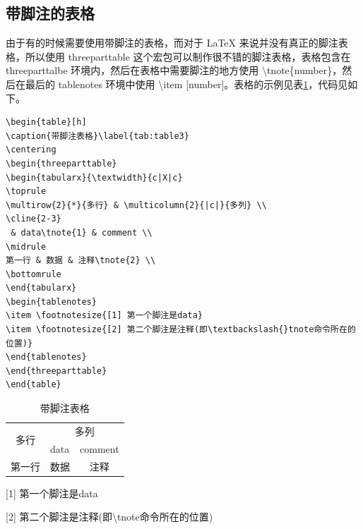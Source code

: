 \documentclass[a4paper,12pt]{ctexart}
\begin{document}
\subsection{带脚注的表格}
由于有的时候需要使用带脚注的表格，而对于 \LaTeX{} 来说并没有真正的脚注表格，所以使用 threeparttable 这个宏包可以制作很不错的脚注表格，表格包含在 threeparttalbe 环境内，然后在表格中需要脚注的地方使用 \textbackslash{}tnote\{number\}，然后在最后的 tablenotes 环境中使用 \textbackslash{}item [number]。表格的示例见表\ref{tab:table3}，代码见如下。

\begin{verbatim}
\begin{table}[h]
\caption{带脚注表格}\label{tab:table3}
\centering
\begin{threeparttable}
\begin{tabularx}{\textwidth}{c|X|c}
\toprule
\multirow{2}{*}{多行} & \multicolumn{2}{|c|}{多列} \\
\cline{2-3}
 & data\tnote{1} & comment \\
\midrule
第一行 & 数据 & 注释\tnote{2} \\
\bottomrule
\end{tabularx}
\begin{tablenotes}
\item \footnotesize{[1] 第一个脚注是data}
\item \footnotesize{[2] 第二个脚注是注释(即\textbackslash{}tnote命令所在的位置)}
\end{tablenotes}
\end{threeparttable}
\end{table}
\end{verbatim}

\begin{table}[h]
\caption{带脚注表格}\label{tab:table3}
\centering
\begin{threeparttable}
\begin{tabularx}{\textwidth}{c|X|c}
\toprule
\multirow{2}{*}{多行} & \multicolumn{2}{c}{多列} \\
\cline{2-3}
 & data\tnote{1} & comment \\
\midrule
第一行 & 数据 & 注释\tnote{2} \\
\bottomrule
\end{tabularx}
\begin{tablenotes}
\item \footnotesize{[1] 第一个脚注是data}
\item \footnotesize{[2] 第二个脚注是注释(即\textbackslash{}tnote命令所在的位置)}
\end{tablenotes}
\end{threeparttable}
\end{table}
\end{document}
